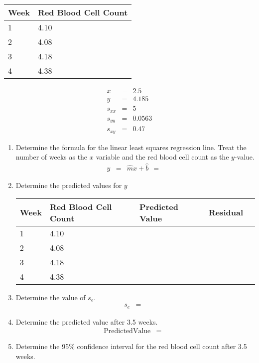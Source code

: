 \documentclass[12pt]{article}
\begin{document}
\begin{enumerate}
\begin{multicols}{2}
  \begin{tabular}{l|l}
    Week & Red Blood Cell Count \\ \hline
    1 & 4.10 \\
    2 & 4.08 \\
    3 & 4.18 \\
    4 & 4.38
  \end{tabular}
  \columnbreak
  \begin{eqnarray*}
    \bar{x} & = & 2.5 \\
    \bar{y} & = & 4.185 \\
    s_{xx}  & = & 5 \\
    s_{yy}  & = & 0.0563 \\
    s_{xy}  & = & 0.47
  \end{eqnarray*}
\end{multicols}
  
  \begin{enumerate}
  \item Determine the formula for the linear least squares regression
    line. Treat the number of weeks as the $x$ variable and the red
    blood cell count as the $y$-value.
    \begin{eqnarray*}
      y & = & \hat{m} x + \hat{b} ~~ = ~~ 
    \end{eqnarray*}
  \item Determine the predicted values for $y$  \\
    \begin{tabular}{l|l|l|l|l}
      Week & Red Blood Cell Count & Predicted Value & Residual\\ \hline
      1 & 4.10 & & \\
      2 & 4.08 & & \\
      3 & 4.18 & & \\
      4 & 4.38 & & 
    \end{tabular}
  \item Determine the value of $s_e$.
    \begin{eqnarray*}
      s_e & = & 
    \end{eqnarray*}
  \item Determine the predicted value after 3.5 weeks.
    \begin{eqnarray*}
      \mathrm{Predicted Value} & = & 
    \end{eqnarray*}
  \item Determine the 95\% confidence interval for the red blood cell
    count after 3.5 weeks.
    \vfill
  \end{enumerate}


\end{enumerate}
\end{document}

